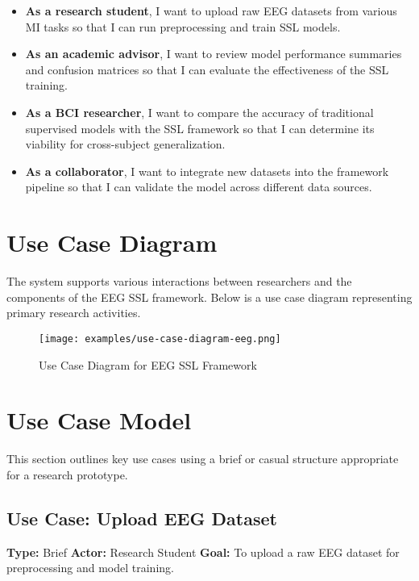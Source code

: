 \begin{itemize}
    \item \textbf{As a research student}, I want to upload raw EEG datasets from various MI tasks so that I can run preprocessing and train SSL models.
    \item \textbf{As an academic advisor}, I want to review model performance summaries and confusion matrices so that I can evaluate the effectiveness of the SSL training.
    \item \textbf{As a BCI researcher}, I want to compare the accuracy of traditional supervised models with the SSL framework so that I can determine its viability for cross-subject generalization.
    \item \textbf{As a collaborator}, I want to integrate new datasets into the framework pipeline so that I can validate the model across different data sources.
\end{itemize}

\section{Use Case Diagram}
\label{section:use-case-diagram}

The system supports various interactions between researchers and the components of the EEG SSL framework. Below is a use case diagram representing primary research activities.

\begin{figure}[H]
    \centering
    \texttt{[image: examples/use-case-diagram-eeg.png]}
    \caption{Use Case Diagram for EEG SSL Framework}
\end{figure}

\section{Use Case Model}
\label{section:use-case-model}

This section outlines key use cases using a brief or casual structure appropriate for a research prototype.

\subsection*{Use Case: Upload EEG Dataset}
\textbf{Type:} Brief
\textbf{Actor:} Research Student
\textbf{Goal:} To upload a raw EEG dataset for preprocessing and model training.

